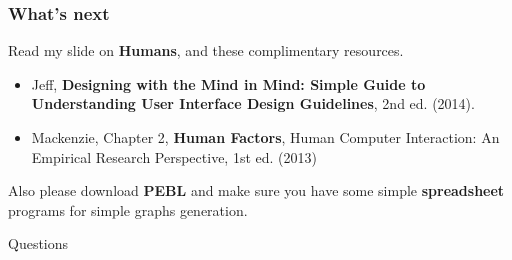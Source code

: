 \documentclass{beamer}
\begin{document}

\begin{frame}
\frametitle{What's next}
Read my slide on \textbf{Humans}, and these complimentary resources.  
	\begin{itemize}
		\item Jeff, \textbf{Designing with the Mind in Mind: Simple Guide to Understanding User Interface Design Guidelines}, 2nd ed. (2014).
		\item Mackenzie, Chapter 2, \textbf{Human Factors},  Human Computer Interaction: An Empirical Research Perspective, 1st ed. (2013) 
	\end{itemize}
Also please download \textbf{PEBL} and make sure you have some simple \textbf{spreadsheet} programs for simple graphs generation.
\end{frame}

\begin{frame}
\Huge{\centerline{Questions}}
\end{frame}
\end{document}
